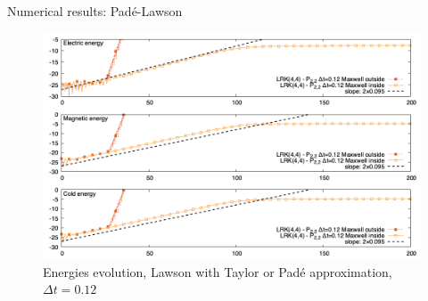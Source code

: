 \documentclass{beamer}
\begin{document}
\begin{frame}{Numerical results: Padé-Lawson}
  \begin{figure}
    \includegraphics[height=0.75\textheight]{img/energy_lrkpt_m}
    \vspace{-0.25cm}
    \caption{Energies evolution, Lawson with Taylor or Padé approximation, $\Delta t = 0.12$}
  \end{figure}
\end{frame}
\end{document}

